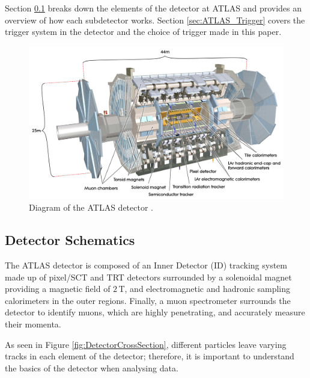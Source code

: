 \documentclass{article}
\begin{document}
Section \ref{sec:ATLAS_DetectorSchematics} breaks down the elements of the detector at ATLAS and provides an overview of how each subdetector works. Section \ref{sec:ATLAS_Trigger} covers the trigger system in the detector and the choice of trigger made in this paper.


\begin{figure}[h]
    \centering
    \includegraphics[scale=0.075]{images/AtlasDetector.jpg}
    \caption{ Diagram of the ATLAS detector \cite{ATLASReview}. \label{fig:ATLASDiagram} }
\end{figure}

\subsection{Detector Schematics}
\label{sec:ATLAS_DetectorSchematics}



The ATLAS detector is composed of an Inner Detector (ID) tracking system made up of pixel/SCT and TRT detectors surrounded by a solenoidal magnet providing a magnetic field of $2\,$T, and electromagnetic and hadronic sampling calorimeters in the outer regions. Finally, a muon spectrometer surrounds the detector to identify muons, which are highly penetrating, and accurately measure their momenta. 

As seen in Figure \ref{fig:DetectorCrossSection}, different particles leave varying tracks in each element of the detector; therefore, it is important to understand the basics of the detector when analysing data.
\end{document}
